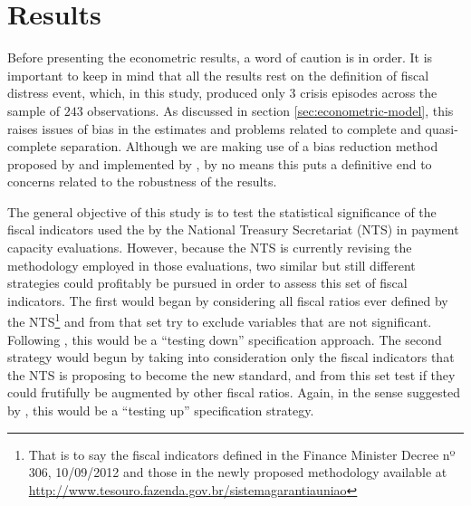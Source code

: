 \chapter{Results}
\label{sec:results}

Before presenting the econometric results, a word of caution is in order. It is important to keep in mind that all the results rest on the definition of fiscal distress event, which, in this study, produced only $3$ crisis episodes across the sample of $243$ observations. As discussed in section \ref{sec:econometric-model}, this raises issues of bias in the estimates and problems related to complete and quasi-complete separation. Although we are making use of a bias reduction method proposed by \citet{firth1993} and implemented by \citet{brglm}, by no means this puts a definitive end to concerns related to the robustness of the results.

The general objective of this study is to test the statistical significance of the fiscal indicators used the by the National Treasury Secretariat (NTS) in payment capacity evaluations. However, because the NTS is currently revising the methodology employed in those evaluations, two similar but still different strategies could profitably be pursued in order to assess this set of fiscal indicators. The first would began by considering all fiscal ratios ever defined by the NTS\footnote{That is to say the fiscal indicators defined in the Finance Minister Decree nº 306, 10/09/2012 and those in the newly proposed methodology available at \url{http://www.tesouro.fazenda.gov.br/sistemagarantiauniao}} and from that set try to exclude variables that are not significant. Following \citet{kennedy2008}, this would be a ``testing down'' specification approach. The second strategy would begun by taking into consideration only the fiscal indicators that the NTS is proposing to become the new standard, and from this set test if they could frutifully be augmented by other fiscal ratios. Again, in the sense suggested by \citet{kennedy2008}, this would be a ``testing up'' specification strategy.

